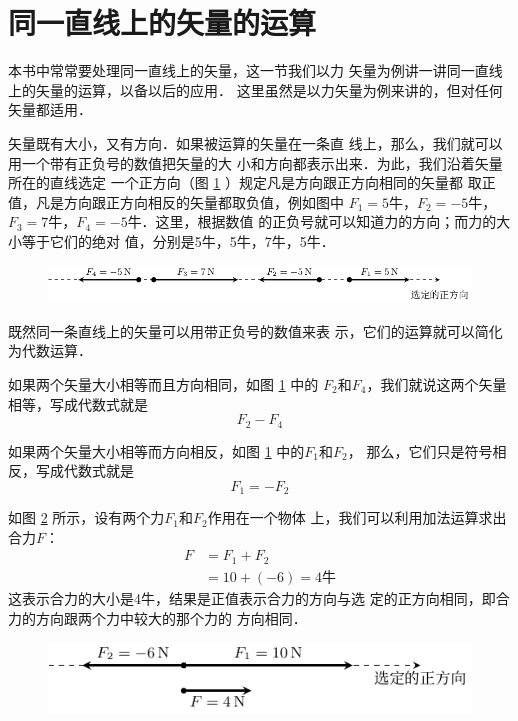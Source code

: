 \section{同一直线上的矢量的运算} 
    本书中常常要处理同一直线上的矢量，这一节我们以力
矢量为例讲一讲同一直线上的矢量的运算，以备以后的应用．
这里虽然是以力矢量为例来讲的，但对任何矢量都适用．

    矢量既有大小，又有方向．如果被运算的矢量在一条直
线上，那么，我们就可以用一个带有正负号的数值把矢量的大
小和方向都表示出来．为此，我们沿着矢量所在的直线选定
一个正方向（图 \ref{fig_A_1-33} ）规定凡是方向跟正方向相同的矢量都
取正值，凡是方向跟正方向相反的矢量都取负值，例如图中
$F_1=5$牛，$F_2=-5$牛，$F_3=7$牛，$F_4=-5$牛．这里，根据数值
的正负号就可以知道力的方向；而力的大小等于它们的绝对
值，分别是5牛，5牛，7牛，5牛．

\begin{figure} [htp]
\centering
\includegraphics{fig/A/1-33.pdf} 
\caption{} \label{fig_A_1-33} 
\end{figure} 

既然同一条直线上的矢量可以用带正负号的数值来表
示，它们的运算就可以简化为代数运算．

    如果两个矢量大小相等而且方向相同，如图 \ref{fig_A_1-33} 中的
$F_2$和$F_4$，我们就说这两个矢量相等，写成代数式就是
\begin{equation} 
F_2-F_4
\end{equation} 

    如果两个矢量大小相等而方向相反，如图 \ref{fig_A_1-33} 中的$F_1$和$F_2$，
那么，它们只是符号相反，写成代数式就是
\begin{equation} 
F_1=-F_2
\end{equation} 

    如图 \ref{fig_A_1-34} 所示，设有两个力$F_1$和$F_2$作用在一个物体
上，我们可以利用加法运算求出合力$F$：
\begin{equation} 
\begin{split} 
F&=F_1+F_2\\
&=10+(-6)=4\text{牛} 
\end{split} 
\end{equation} 
这表示合力的大小是4牛，结果是正值表示合力的方向与选
定的正方向相同，即合力的方向跟两个力中较大的那个力的
方向相同．

\begin{figure} [htp]
\centering
\includegraphics{fig/A/1-34.pdf} 
\caption{} \label{fig_A_1-34} 
\end{figure} 

